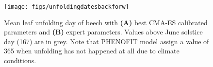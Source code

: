 \documentclass[11pt,]{article}
\begin{document}
\begin{figure}[H]

{\centering \texttt{[image: figs/unfoldingdatesbackforw]} 

}

\caption{Mean leaf unfolding day of beech with \textbf{(A)} best CMA-ES calibrated parameters and \textbf{(B)} expert parameters. Values above June solstice day (167) are in grey. Note that PHENOFIT model assign a value of 365 when unfolding has not happened at all due to climate conditions.}\label{fig:unfoldingdatesbackforw}
\end{figure}





\newpage
\singlespacing
\printbibliography
\end{document}
